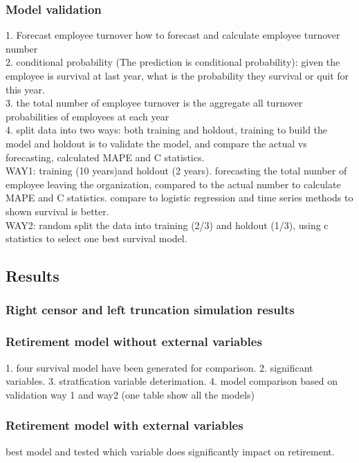 \documentclass[12pt,letterpaper]{article}
\begin{document}
\subsubsection{Model validation}
 1. Forecast employee turnover   how to forecast and calculate employee turnover number\\
 2. conditional probability (The prediction is conditional probability): given the employee is survival at last year, what is the probability they survival or quit for this year.\\
 3. the total number of employee turnover is the aggregate all turnover probabilities of employees at each year\\
      
 4. split data into two ways: both training and holdout, training to build the model and holdout is to validate the model, and compare the actual vs forecasting, calculated MAPE and C statistics. \\ 
       WAY1: training (10 years)and holdout (2 years). forecasting the total number of employee leaving the organization, compared to the actual number to calculate MAPE and C statistics. compare to logistic regression and time series methods to shown survival is better.\\
       WAY2: random split the data into training (2/3) and holdout (1/3), using c statistics to select one best survival model.
  
\subsection{Results}
\subsubsection{Right censor and left truncation simulation results}
\subsubsection{Retirement model without external variables}
   1. four survival model have been generated for comparison. 
   2. significant variables.
   3. stratfication variable deterimation.
   4. model comparison based on validation way 1 and way2 (one table show all the models) 
\subsubsection{Retirement model with external variables}
     best model and tested which variable does significantly impact on retirement.
\end{document}
